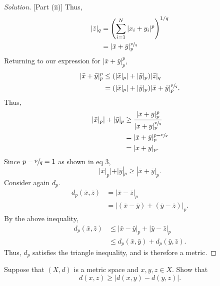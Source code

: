 \documentclass[11pt,letterpaper]{article}
\newenvironment{prob}[1]
  {\renewcommand\theinnerprob{#1}\innerprob}
  {\endinnerprob}
\newenvironment{solution}
  {\renewcommand\qedsymbol{}\begin{proof}[Solution]}
  {\end{proof}\bigskip}
\begin{document}
\begin{solution}[Part (ii)]
	Thus,
	\[
	\begin{split}
		|\bar z|_q &= \left ( \sum_{i=1}^{N} |x_i+y_i|^{p} \right ) ^{1/q}\\
		&= |\bar x + \bar y|_p^{\sfrac{p}{q}}
	\end{split}\]
	Returning to our expression for $|\bar x + \bar y|_p^p$, 
	\[\begin{split}
		|\bar x + \bar y|_p^p &\leq (|\bar x|_p| + |\bar y|_p)|\bar z|_q\\
		&=(|\bar x|_p| + |\bar y|_p) |\bar x + \bar y|_p^{\sfrac{p}{q}}.
	\end{split}\]
	Thus,
	\[\begin{split}
		|\bar x|_p| + |\bar y|_p &\geq \frac{|\bar x + \bar y|_p^p}{|\bar x + \bar y|_p^{\sfrac{p}{q}}}\\
		&= |\bar x + \bar y|_p^{p-\sfrac{p}{q}}\\
		&= |\bar x + \bar y|_p.
	\end{split}\]
	Since $p-\sfrac{p}{q} = 1$ as shown in eq 3, $$|\bar x|_p| + |\bar y|_p \geq|\bar x + \bar y|_p.$$
	Consider again $d_p$. 
	\[\begin{split}
		d_p(\bar x, \bar z) &= |\bar x - \bar z|_p\\
		&= |(\bar x -\bar y) + (\bar y - \bar z)|_p.
	\end{split}\]
	By the above inequality,
	\[\begin{split}
		d_p(\bar x, \bar z) &\leq |\bar x -\bar y|_p + |\bar y - \bar z|_p\\
		&\leq d_p(\bar x, \bar y) + d_p(\bar y, \bar z).
	\end{split}\]
	Thus, $d_p$ satisfies the triangle inequality, and is therefore a metric.
\end{solution}	
\newpage




\begin{prob}{6}  %
Suppose that $(X,d)$ is a metric space and $x,y,z\in X$.  Show that
\[
	d(x,z) \geq |d(x,y) - d(y,z)|.
\]
\end{prob}
\end{document}
